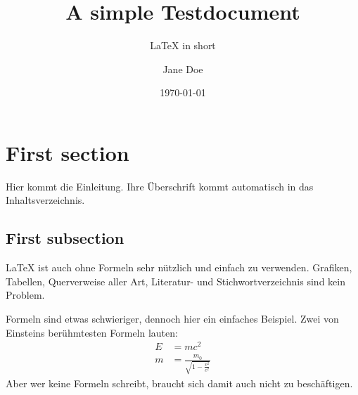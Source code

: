 \documentclass[
  page=a4,
  DIV=12
  ]{scrartcl}
\title{A simple Testdocument}
\subtitle{LaTeX in short}
\author{Jane Doe}
\date{\today}
\begin{document}
\maketitle
\tableofcontents

\section{First section}



Hier kommt die Einleitung. Ihre Überschrift kommt
automatisch in das Inhaltsverzeichnis.

\subsection{First subsection}

\LaTeX{} ist auch ohne Formeln sehr nützlich und
einfach zu verwenden. Grafiken, Tabellen,
Querverweise aller Art, Literatur- und
Stichwortverzeichnis sind kein Problem.

Formeln sind etwas schwieriger, dennoch hier ein
einfaches Beispiel. Zwei von Einsteins
berühmtesten Formeln lauten:
%
\begin{align}
E &= mc^2                 \\
m &= \frac{m_0}{\sqrt{1-\frac{v^2}{c^2}}}
\end{align}
%
Aber wer keine Formeln schreibt, braucht sich
damit auch nicht zu beschäftigen.
\end{document}
